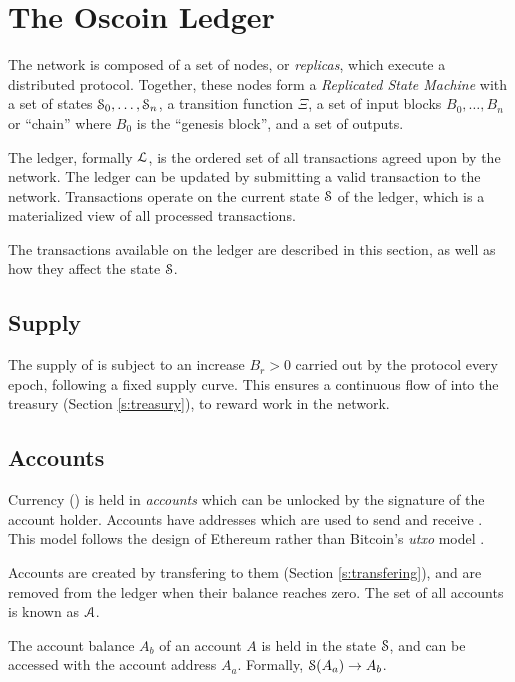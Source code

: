 \section{The Oscoin Ledger}
\label{s:ledger}

\def\posnat{\mathbb{N}_{\geq 1}}

The \oscoin{} network is composed of a set of nodes, or \emph{replicas}, which
execute a distributed protocol. Together, these nodes form a \emph{Replicated
State Machine} with a set of states $\mathcal{S}_0, \ldots, \mathcal{S}_n$, a transition
function $\Xi$, a set of input blocks $B_0, \ldots, B_n$ or ``chain'' where
$B_0$ is the ``genesis block'', and a set of outputs.

The \oscoin{} ledger, formally $\mathcal{L}$, is the ordered set of all
transactions agreed upon by the network. The ledger can be updated by submitting
a valid transaction to the network. Transactions operate on the current state
$\mathcal{S}$ of the ledger, which is a materialized view of all processed transactions.

The transactions available on the ledger are described in this section, as well
as how they affect the state $\mathcal{S}$.

\subsection{Supply}

The supply of \oscoin{} is subject to an increase $B_r > 0$ carried out by the
protocol every epoch, following a fixed supply curve. This ensures a continuous
flow of \oscoin{} into the treasury (Section \ref{s:treasury}), to reward work
in the network.

\subsection{Accounts}
\label{s:accounts}

Currency (\oscoin{}) is held in \emph{accounts} which can be unlocked by the
signature of the account holder. Accounts have addresses which are used to send
and receive \oscoin{}. This model follows the design of Ethereum \cite{ethereum}
rather than Bitcoin's \emph{utxo} model \cite{bitcoin}.

Accounts are created by transfering \oscoin{} to them (Section \ref{s:transfering}),
and are removed from the ledger when their balance reaches zero. The set of all
accounts is known as $\mathcal{A}$.

The account balance $A_b$ of an account $A$ is held in the state $\mathcal{S}$, and
can be accessed with the account address $A_a$. Formally, $\mathcal{S}(A_a) \to A_b$.

